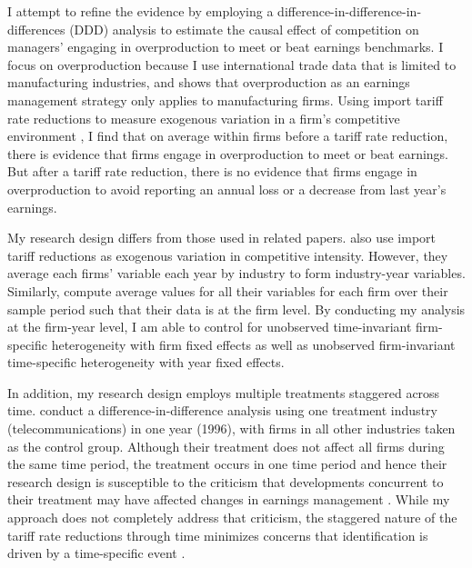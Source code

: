 \documentclass[notitlepage, 12pt]{article}
\begin{document}
\noindent I attempt to refine the evidence by employing a difference-in-difference-in-differences (DDD) analysis to estimate the causal effect of competition on managers' engaging in overproduction to meet or beat earnings benchmarks. I focus on overproduction because I use international trade data that is limited to manufacturing industries, and \citet{roychowdhury:2006} shows that overproduction as an earnings management strategy only applies to manufacturing firms. Using import tariff rate reductions to measure exogenous variation in a firm's competitive environment \citep{valta:2012}, I find that on average within firms before a tariff rate reduction, there is evidence that firms engage in overproduction to meet or beat earnings. But after a tariff rate reduction, there is no evidence that firms engage in overproduction to avoid reporting an annual loss or a decrease from last year's earnings. %
\newline

\noindent My research design differs from those used in related papers. \citet{bc:2012} also use import tariff reductions as exogenous variation in competitive intensity. However, they average each firms' variable each year by industry to form industry-year variables. Similarly, \citet{kst:2012} compute average values for all their variables for each firm over their sample period such that their data is at the firm level. By conducting my analysis at the firm-year level, I am able to control for unobserved time-invariant firm-specific heterogeneity with firm fixed effects as well as unobserved firm-invariant time-specific heterogeneity with year fixed effects.
\newline

\noindent In addition, my research design employs multiple treatments staggered across time. \citet{kst:2012} conduct a difference-in-difference analysis using one treatment industry (telecommunications) in one year (1996), with firms in all other industries taken as the control group. Although their treatment does not affect all firms during the same time period, the treatment occurs in one time period and hence their research design is susceptible to the criticism that developments concurrent to their treatment may have affected changes in earnings management \citep*{cdl:2008}. While my approach does not completely address that criticism, the staggered nature of the tariff rate reductions through time minimizes concerns that identification is driven by a time-specific event \citep{valta:2012}.
\newline
\end{document}
